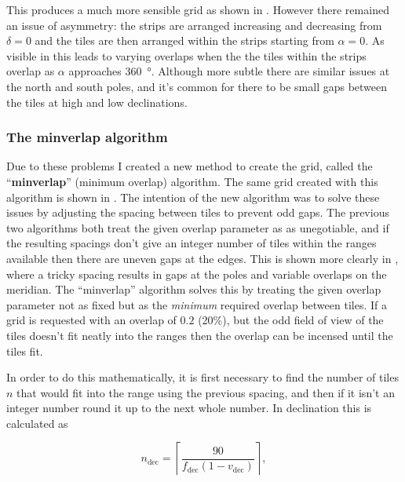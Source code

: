 \begin{colsection}
\begin{colsection}
This produces a much more sensible grid as shown in . However there remained an issue of asymmetry: the strips are arranged increasing and decreasing from $\delta=0$ and the tiles are then arranged within the strips starting from $\alpha=0$. As visible in  this leads to varying overlaps when the the tiles within the strips overlap as $\alpha$ approaches \SI{360}{\degree}. Although more subtle there are similar issues at the north and south poles, and it's common for there to be small gaps between the tiles at high and low declinations.

\subsubsection{The minverlap algorithm}

Due to these problems I created a new method to create the grid, called the ``\textbf{minverlap}'' (minimum overlap) algorithm. The same grid created with this algorithm is shown in . The intention of the new algorithm was to solve these issues by adjusting the spacing between tiles to prevent odd gaps. The previous two algorithms both treat the given overlap parameter as as unegotiable, and if the resulting spacings don't give an integer number of tiles within the ranges available then there are uneven gaps at the edges. This is shown more clearly in , where a tricky spacing results in gaps at the poles and variable overlaps on the meridian. The ``minverlap'' algorithm solves this by treating the given overlap parameter not as fixed but as the \textit{minimum} required overlap between tiles. If a grid is requested with an overlap of $0.2$ (20\%), but the odd field of view of the tiles doesn't fit neatly into the ranges then the overlap can be incensed until the tiles fit.

In order to do this mathematically, it is first necessary to find the number of tiles $n$ that would fit into the range using the previous spacing, and then if it isn't an integer number round it up to the next whole number. In declination this is calculated as

\begin{equation}
    n_\text{dec} = \left \lceil \frac{90}{f_\text{dec}(1-v_\text{dec})} \right \rceil,
    \label{eq:minverlap_ndec}
\end{equation}


\end{colsection}
\end{colsection}
